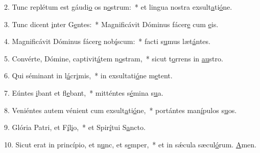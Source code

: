 2. Tunc replétum est gáudi\uline{o} os n\uline{o}strum:~* et lingua nostra exsult\uline{a}ti\uline{ó}ne.\par 
3. Tunc dicent \uline{i}nter G\uline{e}ntes:~* Magnificávit Dóminus fácer\uline{e} cum \uline{e}is.\par 
4. Magnificávit Dóminus fácer\uline{e} nob\uline{í}scum:~* facti s\uline{u}mus læt\uline{á}ntes.\par 
5. Convérte, Dómine, captivit\uline{á}tem n\uline{o}stram,~* sicut t\uline{o}rrens in \uline{au}stro.\par 
6. Qui séminant in l\uline{á}cr\uline{i}mis,~* in exsultati\uline{ó}ne m\uline{e}tent.\par 
7. Eúntes \uline{i}bant et fl\uline{e}bant,~* mitténtes s\uline{é}mina s\uline{u}a.\par 
8. Veniéntes autem vénient cum exsult\uline{a}ti\uline{ó}ne,~* portántes man\uline{í}pulos s\uline{u}os.\par 
9. Glória Patri, et F\uline{í}l\uline{i}o,~* et Spir\uline{í}tui S\uline{a}ncto.\par 
10. Sicut erat in princípio, et n\uline{u}nc, et s\uline{e}mper,~* et in sǽcula sæcul\uline{ó}rum. \uline{A}men.\par 
